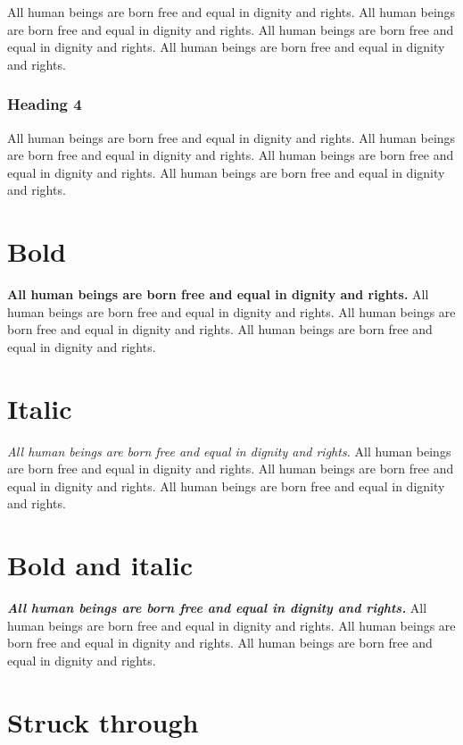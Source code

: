 \documentclass[
  ngerman,
  american,
  titlepage,
  openright,
  DIV=calc,
  toc=listof,
  listof=nochaptergap]{scrbook}
\begin{document}
All human beings are born free and equal in dignity and rights. All
human beings are born free and equal in dignity and rights. All human
beings are born free and equal in dignity and rights. All human beings
are born free and equal in dignity and rights.

\subsubsection{Heading 4}\label{heading-4}

All human beings are born free and equal in dignity and rights. All
human beings are born free and equal in dignity and rights. All human
beings are born free and equal in dignity and rights. All human beings
are born free and equal in dignity and rights.

\section{Bold}\label{bold}

\textbf{All human beings are born free and equal in dignity and rights.}
All human beings are born free and equal in dignity and rights. All
human beings are born free and equal in dignity and rights. All human
beings are born free and equal in dignity and rights.

\section{Italic}\label{italic}

\emph{All human beings are born free and equal in dignity and rights.}
All human beings are born free and equal in dignity and rights. All
human beings are born free and equal in dignity and rights. All human
beings are born free and equal in dignity and rights.

\section{Bold and italic}\label{bold-and-italic}

\textbf{\emph{All human beings are born free and equal in dignity and
rights.}} All human beings are born free and equal in dignity and
rights. All human beings are born free and equal in dignity and rights.
All human beings are born free and equal in dignity and rights.

\section{Struck through}\label{struck-through}
\end{document}
